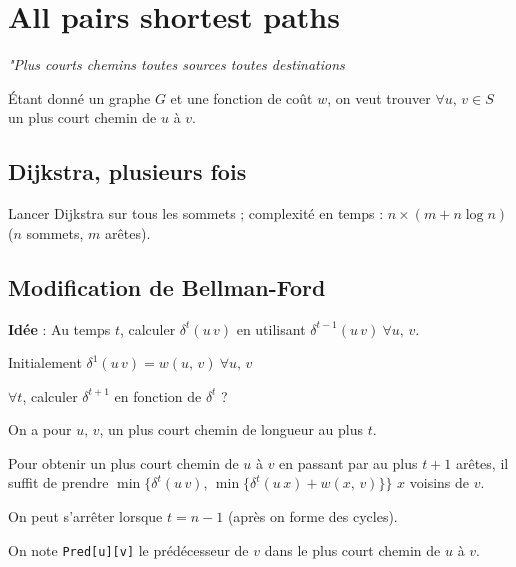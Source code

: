 \chapter{All pairs shortest paths}

\textit{"Plus courts chemins toutes sources toutes destinations}

Étant donné un graphe $G$ et une fonction de coût $w$, on veut trouver $\forall u,\, v \in S$ un plus court chemin de $u$ à $v$.

\section{Dijkstra, plusieurs fois}
Lancer Dijkstra sur tous les sommets ; complexité en temps : $n \times (m + n \log n)$ ($n$ sommets, $m$ arêtes).

\section{Modification de Bellman-Ford}
\textbf{\textcolor{ocre}{Idée}} : Au temps $t$, calculer $\delta^{t}(u\, v)$ en utilisant $\delta^{t-1}(u\, v) \ \forall u,\, v$.

Initialement $\delta^{1}(u\, v) = w(u,\, v) \ \forall u,\, v$

$\forall t$, calculer $\delta^{t+1}$ en fonction de $\delta^{t}$ ?

On a pour $u,\, v$, un plus court chemin de longueur au plus $t$.

Pour obtenir un plus court chemin de $u$ à $v$ en passant par au plus $t + 1$ arêtes, il suffit de prendre $\min \lbrace \delta^{t}(u\, v),\, \min \lbrace \delta^{t}(u\, x) + w(x,\, v) \rbrace \rbrace$ $x$ voisins de $v$.

On peut s'arrêter lorsque $t = n-1$ (après on forme des cycles).

On note \texttt{Pred[u][v]} le prédécesseur de $v$ dans le plus court chemin de $u$ à $v$.


